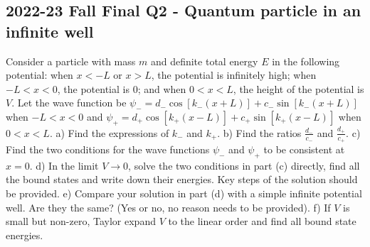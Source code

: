\documentclass[12pt]{book} %
\numberwithin{equation}{chapter}
\begin{document}
\subsection*{2022-23 Fall Final Q2 - Quantum particle in an infinite well}
Consider a particle with mass $m$ and definite total energy $E$ in the following potential: when $x<-L$ or $x>L$, the potential is infinitely high; when $-L<x<0$, the potential is $0$; and when $0<x<L$, the height of the potential is $V$.\bigskip\newline
Let the wave function be $\psi_{-}=d_{-}\cos{\left[k_{-}(x+L)\right]}+c_{-}\sin{\left[k_{-}(x+L)\right]}$ when $-L<x<0$ and $\psi_{+}=d_{+}\cos{\left[k_{+}(x-L)\right]}+c_{+}\sin{\left[k_{+}(x-L)\right]}$ when $0<x<L$.\bigskip\newline
a) Find the expressions of $k_{-}$ and $k_{+}$.\bigskip\newline
b) Find the ratios $\frac{d_{-}}{c_{-}}$ and $\frac{d_{+}}{c_{+}}$.\bigskip\newline
c) Find the two conditions for the wave functions $\psi_{-}$ and $\psi_{+}$ to be consistent at $x=0$.\bigskip\newline
d) In the limit $V\to0$, solve the two conditions in part (c) directly, find all the bound states and write down their energies. Key steps of the solution should be provided.\bigskip\newline
e) Compare your solution in part (d) with a simple infinite potential well. Are they the same? (Yes or no, no reason needs to be provided).\bigskip\newline
f) If $V$ is small but non-zero, Taylor expand $V$ to the linear order and find all bound state energies.
\end{document}
